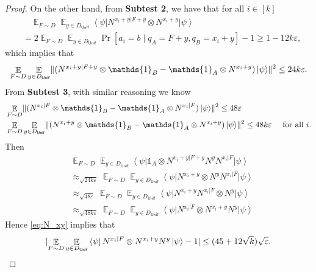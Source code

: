 \documentclass[10pt,a4paper]{article}
\theoremstyle{plain}
\theoremstyle{definition}
\DeclarePairedDelimiter{\norm}{\lVert}{\rVert}
\DeclarePairedDelimiter{\abs}{\lvert}{\rvert}
\newcommand {\bra} [1] {\ensuremath{ \left\langle #1 \right| }}
\newcommand {\ket} [1] {\ensuremath{ \left| #1 \right\rangle }}
\DeclareMathOperator*{\bigE}{\mathbb{E}}
\newcommand {\id} {\ensuremath{\mathds{1}}}
\newcommand{\ep} {\ensuremath{\varepsilon}}
\newcommand{\x}{\otimes}
\newcommand{\appd}[1]{\approx_{#1}}
\newcommand{\1}{\mathbb{1}} %
\newcommand{\Unif}{\mathsf{Unif}}
\begin{document}
\begin{proof}
On the other hand, from \textbf{Subtest 2}, we have that for all $i \in [k]$
\begin{align*}
	&\quad \bigE_{F \sim D}  \bigE_{y \in D_{\Unif}} \bra{\psi} N^{x_i+y | F + y} \x N^{x_i+y} \ket{\psi} \\
	&= 2 \bigE_{F \sim D}  \bigE_{y \in D_{\Unif}} \Pr[a_i = b \mid q_A=F+y, q_B =x_i + y] - 1
	\geq 1 - 12k\ep,
\end{align*}
which implies that 
\begin{align*}
	\bigE_{F \sim D}  \bigE_{y \in D_{\Unif}} \norm{ (N^{x_i + y | F + y} \x \id_B- \id_A \x N^{x_i + y}) \ket{\psi} }^2 \leq 24k\ep.
\end{align*}
From \textbf{Subtest 3}, with similar reasoning we know
\begin{align*}
	&\bigE_{F \sim D} \norm{ (N^{x_i | F} \x \id_B - \id_A \x N^{x_i |F})\ket{\psi}}^2 \leq 48\ep \\
	&\bigE_{F \sim D}  \bigE_{y \in D_{\Unif}} \norm{ (N^{x_i + y} \x \id_B- \id_A \x N^{x_i + y}) \ket{\psi} }^2 \leq 48k\ep \quad \text{ for all } i.
\end{align*}
Then 
\begin{align*}
	&\bigE_{F \sim D}  \bigE_{y \in D_{\Unif}}  \bra{\psi} \id_A \x N^{x_i+y | F + y} N^y N^{x_i | F} \ket{\psi} \\
	&\appd{\sqrt{24 k\ep} } \bigE_{F \sim D}  \bigE_{y \in D_{\Unif}}  \bra{\psi} N^{x_i + y} \x N^y N^{x_i | F} \ket{\psi} \\
	&\appd{\sqrt{48\ep}} \bigE_{F \sim D}  \bigE_{y \in D_{\Unif}}  \bra{\psi} N^{x_i + y}N^{x_i | F}  \x N^y  \ket{\psi} \\
	&\appd{\sqrt{48k\ep}} \bigE_{F \sim D} \bigE_{y \in D_{\Unif}}  \bra{\psi}N^{x_i | F}  \x  N^{x_i + y} N^y  \ket{\psi}
\end{align*}
Hence \cref{eq:N_xy} implies that 
\begin{align}
	\label{eq:N_xy_noxi+y}
	\abs{ \bigE_{F \sim D}  \bigE_{y \in D_{\Unif}} \bra{\psi} N^{x_i| F} \x N^{x_i +y }N^y  \ket{\psi} -1 } \leq (45 + 12\sqrt{k})\sqrt{\ep}.
\end{align}


\end{proof}
\end{document}
